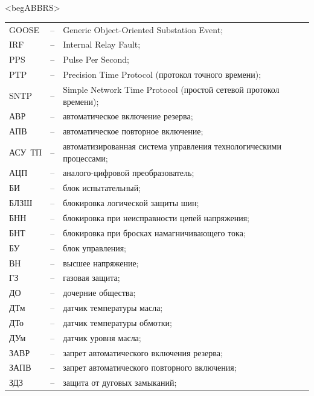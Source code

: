 \color{unimain}\section*{}
{\color{white}\fontsize{0.1pt}{0.1pt}\selectfont<begABBRS>}
\color{black}
\begin{longtable}{>{\raggedright\arraybackslash}m{2cm}>{\raggedright\arraybackslash}m{0.5cm}>{\raggedright\arraybackslash}m{20cm}}
\endfirsthead\endhead\endfoot\endlastfoot
GOOSE & -- & Generic Object-Oriented Substation Event; \\
IRF & -- & Internal Relay Fault; \\
PPS & -- & Pulse Per Second; \\
PTP & -- & Precision Time Protocol (протокол точного времени); \\
SNTP & -- & Simple Network Time Protocol (простой сетевой протокол времени); \\
АВР & -- & автоматическое включение резерва; \\
АПВ & -- & автоматическое повторное включение; \\
АСУ~ТП & -- & автоматизированная система управления технологическими процессами; \\
АЦП & -- & аналого-цифровой преобразователь; \\
БИ & -- & блок испытательный; \\
БЛЗШ & -- & блокировка логической защиты шин; \\
БНН & -- & блокировка при неисправности цепей напряжения; \\
БНТ & -- & блокировка при бросках намагничивающего тока; \\
БУ & -- & блок управления; \\
ВН & -- & высшее напряжение; \\
ГЗ & -- & газовая защита; \\
ДО & -- & дочерние общества; \\
ДТм & -- & датчик температуры масла; \\
ДТо & -- & датчик температуры обмотки; \\
ДУм & -- & датчик уровня масла; \\
ЗАВР & -- & запрет автоматического включения резерва; \\
ЗАПВ & -- & запрет автоматического повторного включения; \\
ЗДЗ & -- & защита от дуговых замыканий; \\

\end{longtable}
